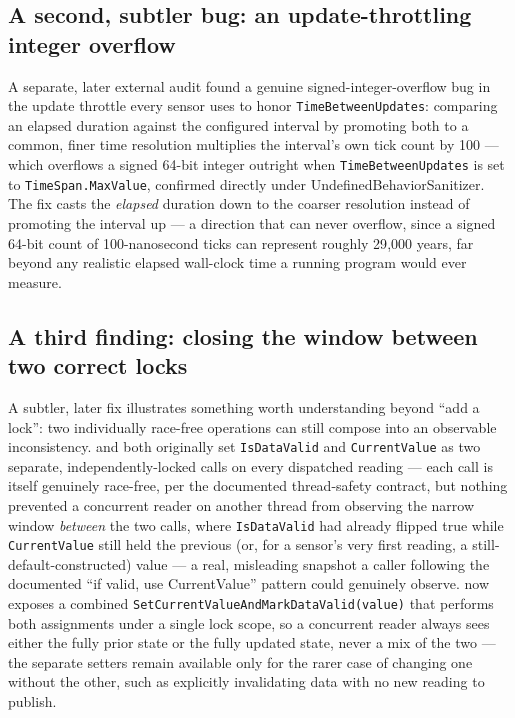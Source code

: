 \subsection{A second, subtler bug: an update-throttling integer overflow}

A separate, later external audit found a genuine signed-integer-overflow bug in the update
throttle every sensor uses to honor \texttt{TimeBetweenUpdates}: comparing an elapsed
duration against the configured interval by promoting both to a common, finer time
resolution multiplies the interval's own tick count by 100 --- which overflows a signed
64-bit integer outright when \texttt{TimeBetweenUpdates} is set to \texttt{TimeSpan.MaxValue},
confirmed directly under UndefinedBehaviorSanitizer. The fix casts the \emph{elapsed}
duration down to the coarser resolution instead of promoting the interval up --- a direction
that can never overflow, since a signed 64-bit count of 100-nanosecond ticks can represent
roughly 29{,}000 years, far beyond any realistic elapsed wall-clock time a running program
would ever measure.

\subsection{A third finding: closing the window between two correct locks}

A subtler, later fix illustrates something worth understanding beyond ``add a lock'': two
individually race-free operations can still compose into an observable inconsistency.
 and  both originally set \texttt{IsDataValid} and
\texttt{CurrentValue} as two separate, independently-locked calls on every dispatched reading
--- each call is itself genuinely race-free, per the documented thread-safety contract, but
nothing prevented a concurrent reader on another thread from observing the narrow window
\emph{between} the two calls, where \texttt{IsDataValid} had already flipped true while
\texttt{CurrentValue} still held the previous (or, for a sensor's very first reading, a
still-default-constructed) value --- a real, misleading snapshot a caller following the
documented ``if valid, use CurrentValue'' pattern could genuinely observe. 
now exposes a combined \texttt{SetCurrentValueAndMarkDataValid(value)} that performs both
assignments under a single lock scope, so a concurrent reader always sees either the fully
prior state or the fully updated state, never a mix of the two --- the separate setters remain
available only for the rarer case of changing one without the other, such as explicitly
invalidating data with no new reading to publish.

